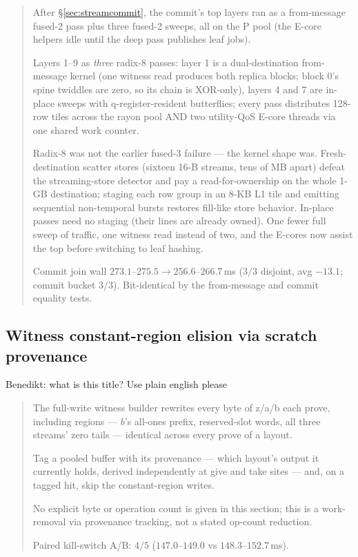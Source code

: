 \documentclass[11pt]{article}
\newcommand{\benedikt}[1]{{\color{red} Benedikt: #1 }}
\newenvironment{optsummary}{%
  \begin{quote}\small
  \begin{description}
  \setlength{\itemsep}{1pt}\setlength{\parsep}{0pt}\setlength{\topsep}{2pt}
}{%
  \end{description}
  \end{quote}
}
\begin{document}
\begin{optsummary}
\item[Baseline:] After \S\ref{sec:streamcommit}, the commit's top layers ran as a from-message fused-2 pass plus three fused-2 sweeps, all on the P pool (the E-core helpers idle until the deep pass publishes leaf jobs).
\item[Improvement:] Layers 1--9 as \emph{three} radix-8 passes: layer 1 is a dual-destination from-message kernel (one witness read produces both replica blocks; block 0's spine twiddles are zero, so its chain is XOR-only), layers 4 and 7 are in-place sweeps with q-register-resident butterflies; every pass distributes 128-row tiles across the rayon pool AND two utility-QoS E-core threads via one shared work counter.
\item[Mechanism:] Radix-8 was not the earlier fused-3 failure --- the kernel shape was. Fresh-destination scatter stores (sixteen 16-B streams, tens of MB apart) defeat the streaming-store detector and pay a read-for-ownership on the whole 1-GB destination; staging each row group in an 8-KB L1 tile and emitting sequential non-temporal bursts restores fill-like store behavior. In-place passes need no staging (their lines are already owned). One fewer full sweep of traffic, one witness read instead of two, and the E-cores now assist the top before switching to leaf hashing.
\item[Result:] Commit join wall $273.1$--$275.5\to256.6$--$266.7\,$ms ($3/3$ disjoint, avg $-13.1$; commit bucket $3/3$). Bit-identical by the from-message and commit equality tests.
\end{optsummary}

\subsection{Witness constant-region elision via scratch provenance}
\label{sec:elision}
\benedikt{what is this title? Use plain english please}
\begin{optsummary}
\item[Baseline:] The full-write witness builder rewrites every byte of z/a/b each prove, including regions --- $b$'s all-ones prefix, reserved-slot words, all three streams' zero tails --- identical across every prove of a layout.
\item[Improvement:] Tag a pooled buffer with its provenance --- which layout's output it currently holds, derived independently at give and take sites --- and, on a tagged hit, skip the constant-region writes.
\item[Mechanism:] No explicit byte or operation count is given in this section; this is a work-removal via provenance tracking, not a stated op-count reduction.
\item[Result:] Paired kill-switch A/B: $4/5$ ($147.0$--$149.0$ vs $148.3$--$152.7\,$ms).
\end{optsummary}
\end{document}
